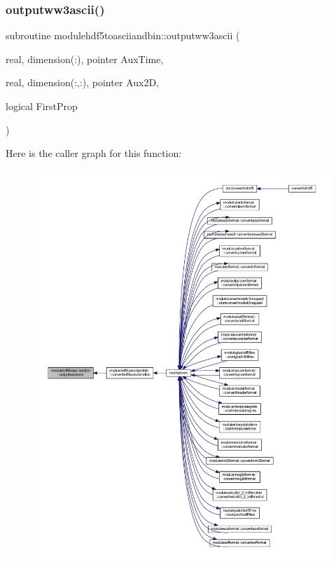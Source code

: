 \subsubsection{\texorpdfstring{outputww3ascii()}{outputww3ascii()}}
{\footnotesize\ttfamily subroutine modulehdf5toasciiandbin\+::outputww3ascii (\begin{DoxyParamCaption}\item[{real, dimension(\+:), pointer}]{Aux\+Time,  }\item[{real, dimension(\+:,\+:), pointer}]{Aux2D,  }\item[{logical}]{First\+Prop }\end{DoxyParamCaption})\hspace{0.3cm}{\ttfamily [private]}}

Here is the caller graph for this function\+:\nopagebreak
\begin{figure}[H]
\begin{center}
\leavevmode
\includegraphics[width=350pt]{namespacemodulehdf5toasciiandbin_a360088fc269895ed548f164fb5b46a13_icgraph}
\end{center}
\end{figure}
\mbox{\label{namespacemodulehdf5toasciiandbin_aac7befc5bf0dee74c56166ddb4432fca}} 
